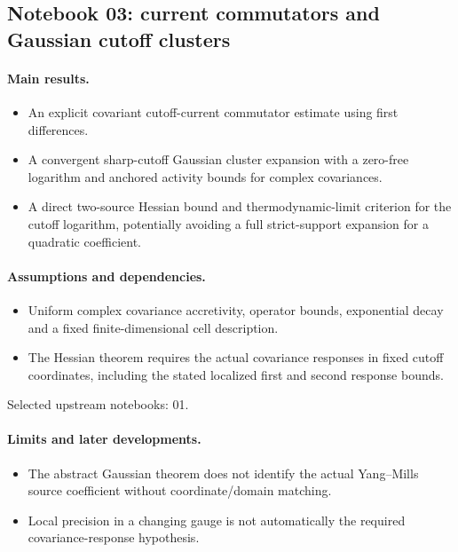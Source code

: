 \subsection{Notebook 03: current commutators and Gaussian cutoff clusters}
\label{hnc-03}
\noindent{}\par

\paragraph{Main results.}
\begin{itemize}
\item An explicit covariant cutoff-current commutator estimate using first differences.
\item A convergent sharp-cutoff Gaussian cluster expansion with a zero-free logarithm and anchored activity bounds for complex covariances.
\item A direct two-source Hessian bound and thermodynamic-limit criterion for the cutoff logarithm, potentially avoiding a full strict-support expansion for a quadratic coefficient.
\end{itemize}

\paragraph{Assumptions and dependencies.}
\begin{itemize}
\item Uniform complex covariance accretivity, operator bounds, exponential decay and a fixed finite-dimensional cell description.
\item The Hessian theorem requires the actual covariance responses in fixed cutoff coordinates, including the stated localized first and second response bounds.
\end{itemize}

Selected upstream notebooks: 01.\par

\paragraph{Limits and later developments.}
\begin{itemize}
\item The abstract Gaussian theorem does not identify the actual Yang--Mills source coefficient without coordinate/domain matching.
\item Local precision in a changing gauge is not automatically the required covariance-response hypothesis.
\end{itemize}

